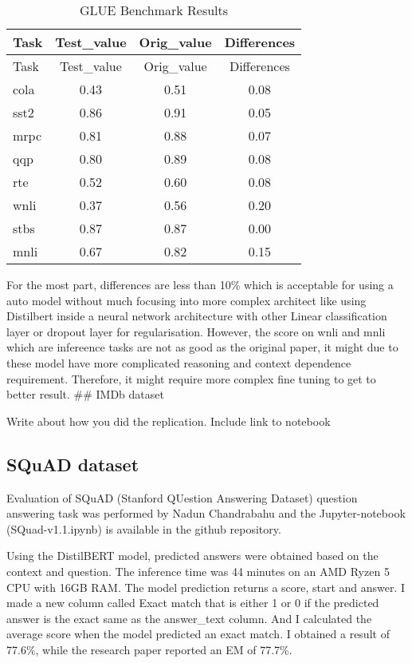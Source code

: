 \documentclass[
  11pt,
]{article}
\begin{document}
\begin{longtable}[]{@{}lccc@{}}
\caption{GLUE Benchmark Results}\tabularnewline
\toprule\noalign{}
Task & Test\_value & Orig\_value & Differences \\
\midrule\noalign{}
\endfirsthead
\toprule\noalign{}
Task & Test\_value & Orig\_value & Differences \\
\midrule\noalign{}
\endhead
\bottomrule\noalign{}
\endlastfoot
cola & 0.43 & 0.51 & 0.08 \\
sst2 & 0.86 & 0.91 & 0.05 \\
mrpc & 0.81 & 0.88 & 0.07 \\
qqp & 0.80 & 0.89 & 0.08 \\
rte & 0.52 & 0.60 & 0.08 \\
wnli & 0.37 & 0.56 & 0.20 \\
stbs & 0.87 & 0.87 & 0.00 \\
mnli & 0.67 & 0.82 & 0.15 \\
\end{longtable}

For the most part, differences are less than 10\% which is acceptable
for using a auto model without much focusing into more complex architect
like using Distilbert inside a neural network architecture with other
Linear classification layer or dropout layer for regularisation.
However, the score on wnli and mnli which are infereence tasks are not
as good as the original paper, it might due to these model have more
complicated reasoning and context dependence requirement. Therefore, it
might require more complex fine tuning to get to better result. \#\#
IMDb dataset

Write about how you did the replication. Include link to notebook

\subsection{SQuAD dataset}\label{squad-dataset-1}

Evaluation of SQuAD (Stanford QUestion Answering Dataset) question
answering task was performed by Nadun Chandrabahu and the
Jupyter-notebook (SQuad-v1.1.ipynb) is available in the github
repository.

Using the DistilBERT model, predicted answers were obtained based on the
context and question. The inference time was 44 minutes on an AMD Ryzen
5 CPU with 16GB RAM. The model prediction returns a score, start and
answer. I made a new column called Exact match that is either 1 or 0 if
the predicted answer is the exact same as the answer\_text column. And I
calculated the average score when the model predicted an exact match. I
obtained a result of 77.6\%, while the research paper reported an EM of
77.7\%.
\end{document}

